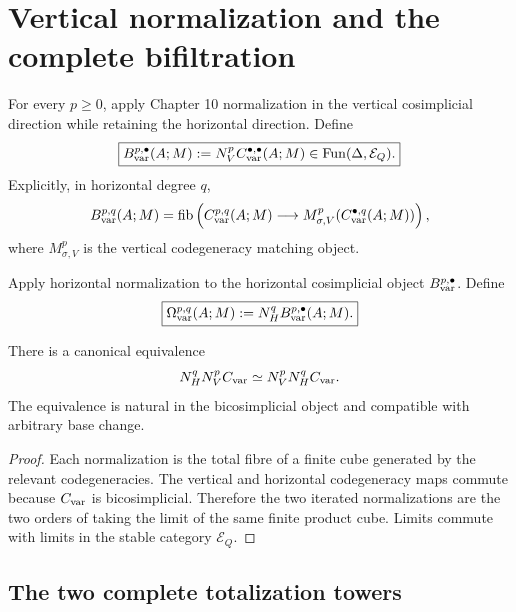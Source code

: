 \section{Vertical normalization and the complete bifiltration}
\label{sec:var-normalization}
\label{sec:var-contact-filtration}

\begin{definition}
\label{def:var-vertical-normalization}
For every \(p\ge0\), apply Chapter 10 normalization in the vertical cosimplicial direction while retaining the horizontal direction. Define
\[
    \boxed{
    B_{\mathrm{var}}^{p,\bullet}(A;M)
    :=
    N_V^pC_{\mathrm{var}}^{\bullet,\bullet}(A;M)
    \in
    \operatorname{Fun}(\Delta,\mathcal E_Q).
    }
\]
Explicitly, in horizontal degree \(q\),
\[
    B_{\mathrm{var}}^{p,q}(A;M)
    =
    \operatorname{fib}\left(
      C_{\mathrm{var}}^{p,q}(A;M)
      \longrightarrow
      M^p_{\sigma,V}(C_{\mathrm{var}}^{\bullet,q}(A;M))
    \right),
\]
where \(M^p_{\sigma,V}\) is the vertical codegeneracy matching object.
\end{definition}

\begin{definition}
\label{def:var-double-normalization}
Apply horizontal normalization to the horizontal cosimplicial object \(B_{\mathrm{var}}^{p,\bullet}\). Define
\[
    \boxed{
    \Omega_{\mathrm{var}}^{p,q}(A;M)
    :=
    N_H^qB_{\mathrm{var}}^{p,\bullet}(A;M).
    }
\]
\end{definition}

\begin{proposition}
\label{prop:var-normalization-commutes}
There is a canonical equivalence
\[
    N_H^qN_V^pC_{\mathrm{var}}
    \simeq
    N_V^pN_H^qC_{\mathrm{var}}.
\]
The equivalence is natural in the bicosimplicial object and compatible with arbitrary base change.
\end{proposition}

\begin{proof}
Each normalization is the total fibre of a finite cube generated by the relevant codegeneracies. The vertical and horizontal codegeneracy maps commute because \(C_{\mathrm{var}}\) is bicosimplicial. Therefore the two iterated normalizations are the two orders of taking the limit of the same finite product cube. Limits commute with limits in the stable category \(\mathcal E_Q\).
\end{proof}

\subsection{The two complete totalization towers}

